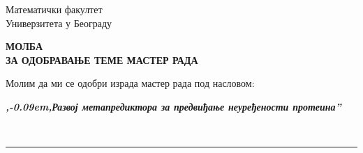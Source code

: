 \documentclass[a4paper]{article}
\def\zn{,\kern-0.09em,}
\begin{document}
\thispagestyle{empty}

\begin{flushleft}
Математички факултет\\
Универзитета у Београду
\end{flushleft}

\bigskip

\begin{center}
\textbf{МОЛБА\\
ЗА ОДОБРАВАЊЕ ТЕМЕ МАСТЕР РАДА
}\end{center}

\bigskip

\begin{flushleft}
Молим да ми се одобри израда мастер рада под насловом:
\end{flushleft}

\begin{minipage}{16.5cm}
\textbf{\textit{\zn Развој метапредиктора за предвиђање неуређености протеина''}}
\end{minipage}\\
\rule[4mm]{17.5cm}{.05mm}
\end{document}
